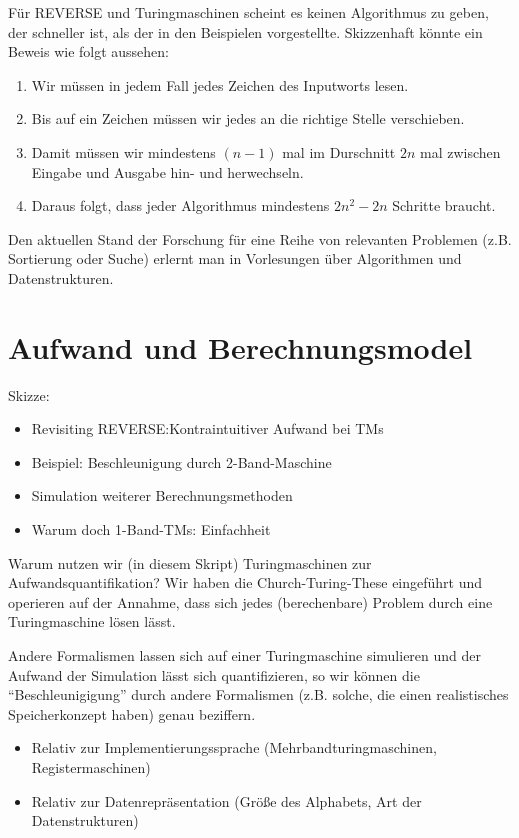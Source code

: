 Für REVERSE und Turingmaschinen scheint es keinen Algorithmus zu geben,
der schneller ist, als der in den Beispielen vorgestellte.
Skizzenhaft könnte ein Beweis wie folgt aussehen:
\begin{enumerate}
        \item Wir müssen in jedem Fall jedes Zeichen des Inputworts lesen.
        \item Bis auf ein Zeichen müssen wir jedes an die richtige Stelle verschieben.
        \item Damit müssen wir mindestens $(n-1)$ mal im Durschnitt $2n$ mal
            zwischen Eingabe und Ausgabe hin- und herwechseln.
        \item Daraus folgt, dass jeder Algorithmus mindestens $2n^2 - 2n$ Schritte braucht.
\end{enumerate}

Den aktuellen Stand der Forschung für eine Reihe von relevanten Problemen
(z.B. Sortierung oder Suche) erlernt man in Vorlesungen über
Algorithmen und Datenstrukturen.



\section{Aufwand und Berechnungsmodel}
Skizze:
\begin{itemize}
        \item Revisiting REVERSE:\@ Kontraintuitiver Aufwand bei TMs
        \item Beispiel: Beschleunigung durch 2-Band-Maschine
        \item Simulation weiterer Berechnungsmethoden
        \item Warum doch 1-Band-TMs: Einfachheit
\end{itemize}

Warum nutzen wir (in diesem Skript) Turingmaschinen zur Aufwandsquantifikation?
Wir haben die Church-Turing-These eingeführt und operieren auf der Annahme,
dass sich jedes (berechenbare) Problem durch eine Turingmaschine lösen lässt.

Andere Formalismen lassen sich auf einer Turingmaschine simulieren und
der Aufwand der Simulation lässt sich quantifizieren,
so wir können die ``Beschleunigigung'' durch andere Formalismen
(z.B. solche, die einen realistisches Speicherkonzept haben)
genau beziffern.

\begin{itemize}
    \item Relativ zur Implementierungssprache (Mehrbandturingmaschinen, Registermaschinen)
    \item Relativ zur Datenrepräsentation (Größe des Alphabets, Art der Datenstrukturen)
\end{itemize}


